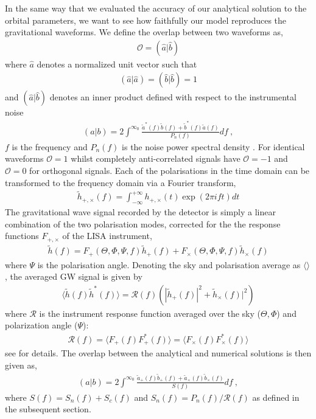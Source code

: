 \documentclass[a4paper,fleqn,usenatbib]{mnras}
\begin{document}
\noindent In the same way that we evaluated the accuracy of our analytical solution to the orbital parameters, we want to see how faithfully our model reproduces the gravitational waveforms. We define the overlap between two waveforms as,
\begin{eqnarray}
\mathcal{O} = (\hat{a}|\hat{b})
\end{eqnarray}
where $\hat{a}$ denotes a normalized unit vector such that
\begin{eqnarray}
(\hat{a}|\hat{a}) = (\hat{b}|\hat{b}) = 1
\end{eqnarray}
and $(\hat{a}|\hat{b})$ denotes an inner product defined with respect to the instrumental noise 
\begin{eqnarray}
(a|b) = 2 \int^{\infty_0} \frac{\tilde{a}^*(f)\tilde{b}(f)+\tilde{b}^*(f)\tilde{a}(f)}{P_n(f)} df \ ,
\end{eqnarray}
$f$ is the frequency and $P_n(f)$ is the noise power spectral density \citep[PSD, ][]{Cutler1994}. For identical waveforms $\mathcal{O} = 1$ whilst completely anti-correlated signals have $\mathcal{O} = -1 $ and $\mathcal{O} = 0$ for orthogonal signals. Each of the polarisations in the time domain can be transformed to the frequency domain via a Fourier transform,
\begin{eqnarray}
\tilde{h}_{+, \times}(f)  = \int_{- \infty}^{+\infty} h_{+, \times}(t) \exp(2 \pi i f t) dt
\end{eqnarray}
The gravitational wave signal recorded by the detector is simply a linear combination of the two polarisation modes, corrected for the the response functions $F_{+, \times}$ of the LISA instrument,
\begin{eqnarray}
\tilde{h}(f) = F_+(\Theta, \Phi, \Psi, f) \tilde{h}_+(f) + F_{\times}(\Theta, \Phi, \Psi, f) \tilde{h}_{\times}(f)
\end{eqnarray}
where $\Psi$ is the polarisation angle. Denoting the sky and polarisation average as $\langle \rangle$, the averaged GW signal is given by
\begin{eqnarray}
\langle \tilde{h}(f) \tilde{h}^*(f) \rangle = \mathcal{R}(f) \left( |\tilde{h}_+(f)|^2 + \tilde{h}_{\times}(f)|^2  \right)
\end{eqnarray}
where $\mathcal{R}$ is the instrument response function averaged over the sky ($\Theta, \Phi$) and polarization angle ($\Psi$): 
\begin{eqnarray}
\mathcal{R} (f) = \langle F_{+} (f) F_{+}^*(f) \rangle =\langle F_{\times} (f) F_{\times}^*(f) \rangle
\end{eqnarray}
see \citet{Robson2019} for details. The overlap between the analytical and numerical solutions is then given as,
\begin{eqnarray}
(a|b) = 2 \int^{\infty_0} \frac{\tilde{a}_+(f) \tilde{b}_+(f) +\tilde{a}_{\times}(f) \tilde{b}_{\times}(f)  }{S(f)} df \ ,
\end{eqnarray}
where $S(f) = S_n(f) + S_c(f)$ and $S_n (f)= P_n(f) / \mathcal{R}(f)$ as defined in the subsequent section.
\end{document}
